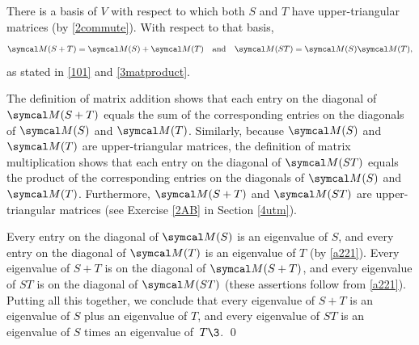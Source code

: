 \proof
There is a basis of $V$ with respect to which both $S$ and $T$ have upper-triangular matrices (by \ref{2commute}). With respect to that basis,
\[
\M(S+T) = \M(S) + \M(T) \andd \M(ST) = \M(S) \M(T),
\]
as stated in \ref{101} and \ref{3matproduct}.

The definition of matrix addition shows that each entry on the diagonal of $\M(S+T)$ equals the sum of the corresponding entries on the diagonals of $\M(S)$ and $\M(T)$. Similarly, because $\M(S)$ and $\M(T)$ are upper-triangular matrices, the definition of matrix multiplication shows that each entry on the diagonal of $\M(ST)$ equals the product of the corresponding entries on the diagonals of $\M(S)$ and $\M(T)$. Furthermore, $\M(S+T)$ and $\M(ST)$ are upper-triangular matrices (see Exercise \ref{2AB} in Section \ref{4utm}).

Every entry on the diagonal of $\M(S)$ is an eigenvalue of $S$, and every entry on the diagonal of $\M(T)$ is an eigenvalue of $T$ (by \ref{a221}). Every eigenvalue of $S+T$ is on the diagonal of $\M(S+T)$, and every eigenvalue of $ST$ is on the diagonal of $\M(ST)$ (these assertions follow from \ref{a221}). Putting all this together, we conclude that every eigenvalue of $S + T$ is an eigenvalue of $S$ plus an eigenvalue of $T$, and every eigenvalue of $ST$ is an eigenvalue of $S$ times an eigenvalue of~$T\3$.%
%
\qed

